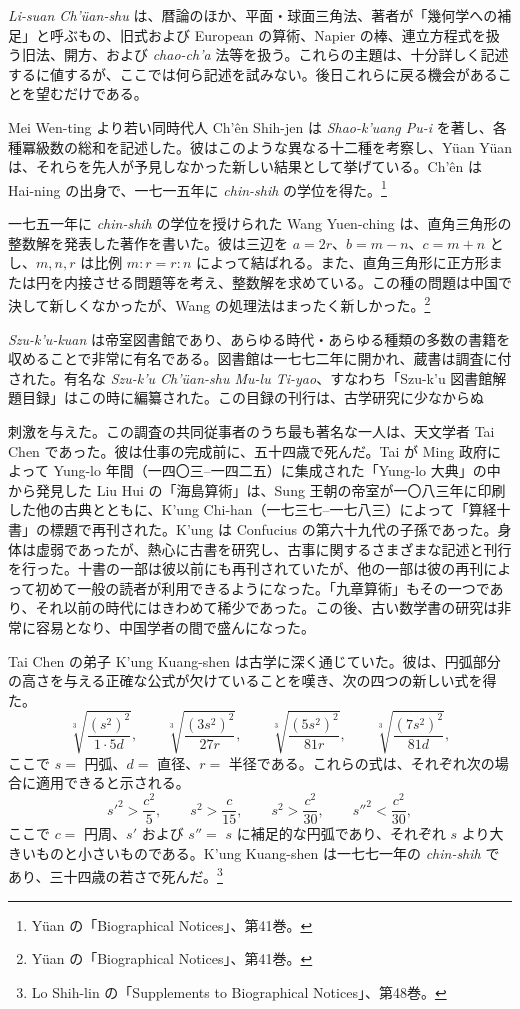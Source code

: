 \documentclass[11pt]{article}
\newcommand{\scanpage}[2]{\clearpage\setcounter{footnote}{0}\noindent{\footnotesize\color{gray}PDF #1 頁 · #2}\par\medskip}
\newcommand{\scanfooter}{}
\begin{document}
\emph{Li-suan Ch'üan-shu} は、暦論のほか、平面・球面三角法、著者が「幾何学への補足」と呼ぶもの、旧式および European の算術、Napier の棒、連立方程式を扱う旧法、開方、および \emph{chao-ch'a} 法等を扱う。これらの主題は、十分詳しく記述するに値するが、ここでは何ら記述を試みない。後日これらに戻る機会があることを望むだけである。

Mei Wen-ting より若い同時代人 Ch'ên Shih-jen は \emph{Shao-k'uang Pu-i} を著し、各種冪級数の総和を記述した。彼はこのような異なる十二種を考察し、Yüan Yüan は、それらを先人が予見しなかった新しい結果として挙げている。Ch'ên は Hai-ning の出身で、一七一五年に \emph{chin-shih} の学位を得た。\footnote{Yüan の「Biographical Notices」、第41巻。}

一七五一年に \emph{chin-shih} の学位を授けられた Wang Yuen-ching は、直角三角形の整数解を発表した著作を書いた。彼は三辺を $a=2r$、$b=m-n$、$c=m+n$ とし、$m,n,r$ は比例 $m:r=r:n$ によって結ばれる。また、直角三角形に正方形または円を内接させる問題等を考え、整数解を求めている。この種の問題は中国で決して新しくなかったが、Wang の処理法はまったく新しかった。\footnote{Yüan の「Biographical Notices」、第41巻。}

\emph{Szu-k'u-kuan} は帝室図書館であり、あらゆる時代・あらゆる種類の多数の書籍を収めることで非常に有名である。図書館は一七七二年に開かれ、蔵書は調査に付された。有名な \emph{Szu-k'u Ch'üan-shu Mu-lu Ti-yao}、すなわち「Szu-k'u 図書館解題目録」はこの時に編纂された。この目録の刊行は、古学研究に少なからぬ
\scanfooter

\scanpage{0137}{第18章、印刷頁123}
刺激を与えた。この調査の共同従事者のうち最も著名な一人は、天文学者 Tai Chen であった。彼は仕事の完成前に、五十四歳で死んだ。Tai が Ming 政府によって Yung-lo 年間（一四〇三--一四二五）に集成された「Yung-lo 大典」の中から発見した Liu Hui の「海島算術」は、Sung 王朝の帝室が一〇八三年に印刷した他の古典とともに、K'ung Chi-han（一七三七--一七八三）によって「算経十書」の標題で再刊された。K'ung は Confucius の第六十九代の子孫であった。身体は虚弱であったが、熱心に古書を研究し、古事に関するさまざまな記述と刊行を行った。十書の一部は彼以前にも再刊されていたが、他の一部は彼の再刊によって初めて一般の読者が利用できるようになった。「九章算術」もその一つであり、それ以前の時代にはきわめて稀少であった。この後、古い数学書の研究は非常に容易となり、中国学者の間で盛んになった。

Tai Chen の弟子 K'ung Kuang-shen は古学に深く通じていた。彼は、円弧部分の高さを与える正確な公式が欠けていることを嘆き、次の四つの新しい式を得た。
\[
\sqrt[3]{\frac{(s^2)^2}{1\cdot 5d}},\qquad
\sqrt[3]{\frac{(3s^2)^2}{27r}},\qquad
\sqrt[3]{\frac{(5s^2)^2}{81r}},\qquad
\sqrt[3]{\frac{(7s^2)^2}{81d}},
\]
ここで $s=$ 円弧、$d=$ 直径、$r=$ 半径である。これらの式は、それぞれ次の場合に適用できると示される。
\[
{s'}^2>\frac{c^2}{5},\qquad
s^2>\frac{c}{15},\qquad
s^2>\frac{c^2}{30},\qquad
{s''}^2<\frac{c^2}{30},
\]
ここで $c=$ 円周、$s'$ および $s''=$ $s$ に補足的な円弧であり、それぞれ $s$ より大きいものと小さいものである。K'ung Kuang-shen は一七七一年の \emph{chin-shih} であり、三十四歳の若さで死んだ。\footnote{Lo Shih-lin の「Supplements to Biographical Notices」、第48巻。}
\end{document}
